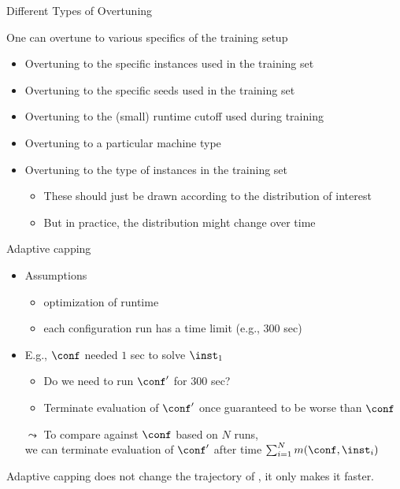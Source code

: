 \begin{frame}[c,fragile]{Different Types of Overtuning}

One can overtune to various specifics of the training setup
\begin{itemize}
\item Overtuning to the specific instances used in the training set 
\item Overtuning to the specific seeds used in the training set
\pause
\item Overtuning to the (small) runtime cutoff used during training 
\item Overtuning to a particular machine type
\pause
\item Overtuning to the type of instances in the training set
\begin{itemize}
\item These should just be drawn according to the distribution of interest
\item But in practice, the distribution might change over time 
\end{itemize}	 
\end{itemize}	

\end{frame}
\begin{frame}[c,fragile]{Adaptive capping}

\begin{itemize}
\item Assumptions
\begin{itemize} 
\item optimization of runtime
\item each configuration run has a time limit (e.g., $300$ sec)
\end{itemize}
\pause    

\item E.g., $\conf$ needed $1$ sec to solve $\inst_1$
\begin{itemize}
\item Do we need to run $\conf'$ for $300$ sec?
\item Terminate evaluation of $\conf'$ once guaranteed to be worse than $\conf$
\end{itemize}
\pause
\bigskip    
\item[$\leadsto$] To compare against $\conf$ based on $N$ runs,\\we can terminate evaluation of $\conf'$ after time $\sum_{i=1}^N m(\conf,\inst_i)$
\end{itemize}

\pause
\begin{theorem}
Adaptive capping does not change the trajectory of \paramils{}, it only makes it faster. 
\end{theorem}

\end{frame}
